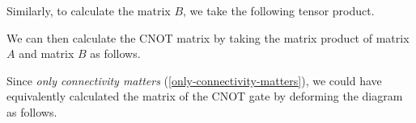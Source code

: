Similarly, to calculate the matrix $B$, we take the following tensor product.


We can then calculate the CNOT matrix by taking the matrix product of matrix $A$ and matrix $B$ as follows.


Since \textit{only connectivity matters} (\ref{only-connectivity-matters}), we could have equivalently calculated the matrix of the CNOT gate by deforming the diagram as follows.

\vspace{10pt}

